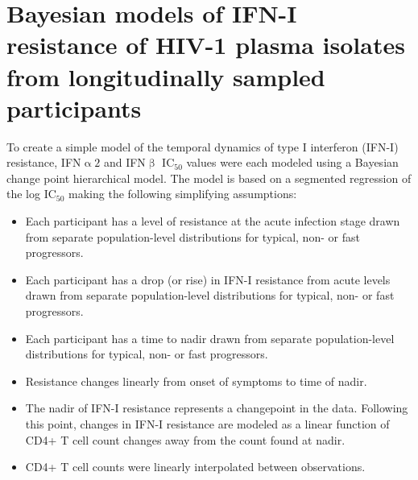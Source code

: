 \documentclass[12pt]{article}
\newcommand{\ifna}{IFN\hspace{-.08em}${\upalpha 2}$}
\newcommand{\ifnb}{IFN\hspace{-.03em}${\upbeta}$}
\newcommand{\icFifty}{IC$_{50}$}
\begin{document}
\begin{center}
 \Large\textbf{}
\end{center}
\section*{Bayesian models of IFN-I resistance of HIV-1 plasma isolates from longitudinally sampled participants}
To create a simple model of the temporal dynamics of type I interferon (IFN-I) resistance, \ifna{} and \ifnb{} \icFifty{} values were each modeled using a Bayesian change point hierarchical model.
  The model is based on a segmented regression of the log \icFifty{} making the following simplifying assumptions:
    \begin{itemize}
          \item Each participant has a level of resistance at the acute infection stage drawn from separate population-level distributions for typical, non- or fast progressors.
          \item Each participant has a drop (or rise) in IFN-I resistance from acute levels drawn from separate population-level distributions for typical, non- or fast progressors.
          \item Each participant has a time to nadir drawn from separate population-level distributions for typical, non- or fast progressors.
          \item Resistance changes linearly from onset of symptoms to time of nadir.
          \item The nadir of IFN-I resistance represents a changepoint in the data. Following this point, changes in IFN-I resistance are modeled as a linear function of CD4+ T cell count changes away from the count found at nadir.
          \item CD4+ T cell counts were linearly interpolated between observations.
    \end{itemize}
  
\end{document}
